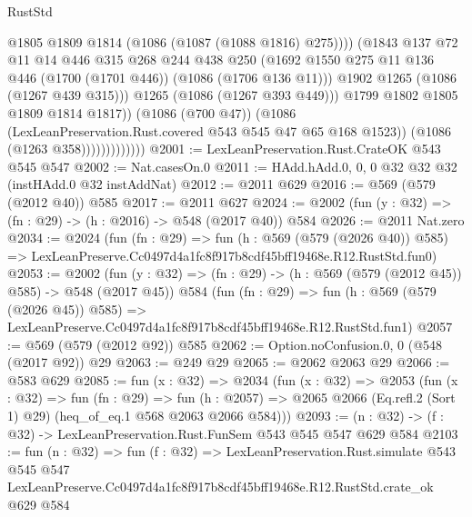 \begin{lexlean}{RustStd}
\begin{coremodule}
                                    @1805
                                    @1809
                                    @1814
                                    (@1086 (@1087 (@1088 @1816) @275))))
                                (@1843
                                  @137
                                  @72
                                  @11
                                  @14
                                  @446
                                  @315
                                  @268
                                  @244
                                  @438
                                  @250
                                  (@1692
                                    @1550
                                    @275
                                    @11
                                    @136
                                    @446
                                    (@1700 (@1701 @446))
                                    (@1086 (@1706 @136 @11)))
                                  @1902
                                  @1265
                                  (@1086 (@1267 @439 @315)))
                                @1265
                                (@1086 (@1267 @393 @449)))
                              @1799
                              @1802
                              @1805
                              @1809
                              @1814
                              @1817))
                          (@1086 (@700 @47))
                          (@1086 (LexLeanPreservation.Rust.covered @543 @545 @47 @65 @168 @1523))
                          (@1086 (@1263 @358)))))))))))))
@2001 := LexLeanPreservation.Rust.CrateOK @543 @545 @547
@2002 := Nat.casesOn.{0}
@2011 := HAdd.hAdd.{0, 0, 0} @32 @32 @32 (instHAdd.{0} @32 instAddNat)
@2012 := @2011 @629
@2016 := @569 (@579 (@2012 @40)) @585
@2017 := @2011 @627
@2024 := @2002 (fun (y : @32) => (fn : @29) -> (h : @2016) -> @548 (@2017 @40)) @584
@2026 := @2011 Nat.zero
@2034 := @2024
    (fun (fn : @29) =>
    fun (h : @569 (@579 (@2026 @40)) @585) =>
    LexLeanPreserve.Cc0497d4a1fc8f917b8cdf45bff19468e.R12.RustStd.fun0)
@2053 := @2002
    (fun (y : @32) => (fn : @29) -> (h : @569 (@579 (@2012 @45)) @585) -> @548 (@2017 @45))
    @584
    (fun (fn : @29) =>
    fun (h : @569 (@579 (@2026 @45)) @585) =>
    LexLeanPreserve.Cc0497d4a1fc8f917b8cdf45bff19468e.R12.RustStd.fun1)
@2057 := @569 (@579 (@2012 @92)) @585
@2062 := Option.noConfusion.{0, 0} (@548 (@2017 @92)) @29
@2063 := @249 @29
@2065 := @2062 @2063 @29
@2066 := @583 @629
@2085 := fun (x : @32) =>
  @2034
    (fun (x : @32) =>
    @2053
      (fun (x : @32) =>
      fun (fn : @29) =>
      fun (h : @2057) =>
      @2065 @2066 (Eq.refl.{2} (Sort 1) @29) (heq_of_eq.{1} @568 @2063 @2066 @584)))
@2093 := (n : @32) -> (f : @32) -> LexLeanPreservation.Rust.FunSem @543 @545 @547 @629 @584
@2103 := fun (n : @32) =>
  fun (f : @32) =>
  LexLeanPreservation.Rust.simulate
    @543
    @545
    @547
    LexLeanPreserve.Cc0497d4a1fc8f917b8cdf45bff19468e.R12.RustStd.crate_ok
    @629
    @584
\end{coremodule}
\end{lexlean}
